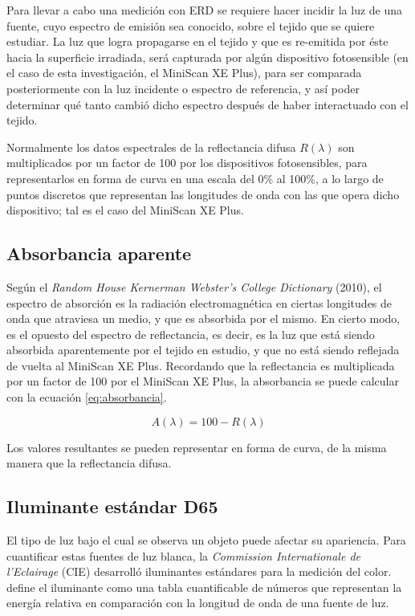 		Para llevar a cabo una medici\'{o}n con ERD se requiere hacer incidir la luz de una fuente, cuyo espectro de emisi\'{o}n sea conocido, sobre el tejido que se quiere estudiar. La luz que logra propagarse en el tejido y que es re-emitida por \'{e}ste hacia la superficie irradiada, ser\'{a} capturada por alg\'{u}n dispositivo fotosensible (en el caso de esta investigaci\'{o}n, el MiniScan XE Plus), para ser comparada posteriormente con la luz incidente o espectro de referencia, y as\'{i} poder determinar qu\'{e} tanto cambi\'{o} dicho espectro despu\'{e}s de haber interactuado con el tejido.
		
		Normalmente los datos espectrales de la reflectancia difusa $R(\lambda)$ son multiplicados por un factor de 100 por los dispositivos fotosensibles, para representarlos en forma de curva en una escala del 0\% al 100\%, a lo largo de puntos discretos que representan las longitudes de onda con las que opera dicho dispositivo; tal es el caso del MiniScan XE Plus.
	
	\subsection{Absorbancia aparente}
	
	Seg\'{u}n el \textit{Random House Kernerman Webster's College Dictionary} (2010), el espectro de absorci\'{o}n es la radiaci\'{o}n electromagn\'{e}tica en ciertas longitudes de onda que atraviesa un medio, y que es absorbida por el mismo. En cierto modo, es el opuesto del espectro de reflectancia, es decir, es la luz que est\'{a} siendo absorbida aparentemente por el tejido en estudio, y que no est\'{a} siendo reflejada de vuelta al MiniScan XE Plus. Recordando que la reflectancia es multiplicada por un factor de 100 por el MiniScan XE Plus, la absorbancia se puede calcular con la ecuaci\'{o}n \ref{eq:absorbancia}.
	
\begin{equation}\label{eq:absorbancia}
	A(\lambda) = 100 - R(\lambda)
\end{equation}	
	 
	 Los valores resultantes se pueden representar en forma de curva, de la misma manera que la reflectancia difusa.

	\subsection{Iluminante est\'{a}ndar D65}
		
		El tipo de luz bajo el cual se observa un objeto puede afectar su apariencia. Para cuantificar estas fuentes de luz blanca, la \textit{Commission Internationale de l'Eclairage} (CIE) desarroll\'{o} iluminantes est\'{a}ndares para la medici\'{o}n del color.
		\cite{HunterLab} define el iluminante como una tabla cuantificable de n\'{u}meros que representan la energ\'{i}a relativa en comparaci\'{o}n con la longitud de onda de una fuente de luz. 
		
